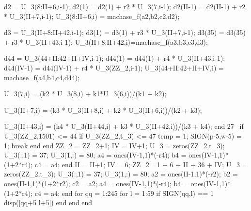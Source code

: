 \documentclass{article}
\begin{document}
	d2 = U_3(8:II+6,i-1); 
	d2(1) = d2(1) + r2 * U_3(7,i-1); 
	d2(II-1) = d2(II-1) + r2 * U_3(II+7,i-1); 
	U_3(8:II+6,i) = machase_f(a2,b2,c2,d2); 
	
	d3 = U_3(II+8:II+42,i-1); 
	d3(1) = d3(1) + r3 * U_3(II+7,i-1); 
	d3(35) = d3(35) + r3 * U_3(II+43,i-1); 
	U_3(II+8:II+42,i)=machase_f(a3,b3,c3,d3); 
	
	d44 = U_3(44+II:42+II+IV,i-1); 
	d44(1) = d44(1) + r4 * U_3(II+43,i-1); 
	d44(IV-1) = d44(IV-1) + r4 * U_3(ZZ_2,i-1); 
	U_3(44+II:42+II+IV,i) = machase_f(a4,b4,c4,d44); 
	
	U_3(7,i) = (k2 * U_3(8,i) + k1*U_3(6,i))/(k1 + k2); 
	
	U_3(II+7,i) = (k3 * U_3(II+8,i) + k2 * U_3(II+6,i))/(k2 + k3); 
	
	U_3(II+43,i) = (k4 * U_3(II+44,i) + k3 * U_3(II+42,i))/(k3 + k4); 
	end 
	27 
	if U_3(ZZ_2,1501) <= 44 
	if U_3(ZZ_2,t_3) <= 47 
	temp = 1; 
	SIGN(p-5,w-5) = 1; 
	break 
	end 
	end 
	ZZ_2 = ZZ_2+1; 
	IV = IV+1; 
	U_3 = zeros(ZZ_2,t_3); 
	U_3(:,1) = 37; 
	U_3(1,:) = 80;%
	a4 = ones(IV-1,1)*(-r4); 
	b4 = ones(IV-1,1)*(1+2*r4); 
	c4 = a4; 
	end 
	II = II+1; 
	IV = 6; 
	ZZ_2 =1 + 6 + II + 36 + IV; 
	U_3 = zeros(ZZ_2,t_3); 
	U_3(:,1) = 37; 
	U_3(1,:) = 80;%
	a2 = ones(II-1,1)*(-r2); 
	b2 = ones(II-1,1)*(1+2*r2); 
	c2 = a2; 
	a4 = ones(IV-1,1)*(-r4); 
	b4 = ones(IV-1,1)*(1+2*r4); 
	c4 = a4; 
	end 
	for qq = 1:245 
	for l = 1:59 
	if SIGN(qq,l) == 1 
	disp([qq+5 l+5]) 
	end 
	end 
	end
	
	
	
	
	
	
	
\end{document}
